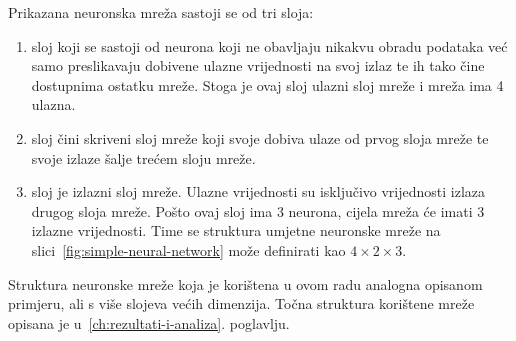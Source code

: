 Prikazana neuronska mreža sastoji se od tri sloja:
\begin{enumerate}
    \item sloj koji se sastoji od neurona koji ne obavljaju nikakvu obradu podataka već samo preslikavaju dobivene
    ulazne vrijednosti na svoj izlaz te ih tako čine dostupnima ostatku mreže. Stoga je ovaj sloj ulazni sloj mreže i
    mreža ima 4 ulazna.
    \item sloj čini skriveni sloj mreže koji svoje dobiva ulaze od prvog sloja mreže te svoje izlaze šalje trećem sloju
    mreže.
    \item sloj je izlazni sloj mreže. Ulazne vrijednosti su isključivo vrijednosti izlaza drugog sloja mreže. Pošto ovaj
    sloj ima 3 neurona, cijela mreža će imati 3 izlazne vrijednosti. Time se struktura umjetne neuronske mreže na
    slici\ \ref{fig:simple-neural-network} može definirati kao $4 \times 2 \times 3$.
\end{enumerate}
Struktura neuronske mreže koja je korištena u ovom radu analogna opisanom primjeru, ali s više slojeva većih dimenzija.
Točna struktura korištene mreže opisana je u\ \ref{ch:rezultati-i-analiza}. poglavlju.


